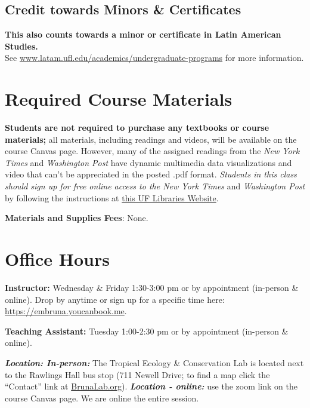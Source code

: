 \documentclass[
  10pt,
  letterpaper,
  oneside,
  open=any]{scrbook}
\begin{document}
\section*{Credit towards Minors \&
Certificates}\label{credit-towards-minors-certificates}


\textbf{This also counts towards a minor or certificate in Latin
American Studies.}\\
See
\href{https://www.latam.ufl.edu/academics/undergraduate-programs/}{www.latam.ufl.edu/academics/undergraduate-programs}
for more information.


\chapter{Required Course Materials}\label{required-course-materials}

\textbf{Students are not required to purchase any textbooks or course
materials;} all materials, including readings and videos, will be
available on the course Canvas page. However, many of the assigned
readings from the \emph{New York Times} and \emph{Washington Post} have
dynamic multimedia data visualizations and video that can't be
appreciated in the posted .pdf format. \emph{Students in this class
should sign up for free online access to the New York Times} and
\emph{Washington Post} by following the instructions at
\href{https://businesslibrary.uflib.ufl.edu/c.php?g=943928&p=7708734}{this
UF Libraries Website}.

\textbf{Materials and Supplies Fees}: None.


\chapter{Office Hours}\label{office-hours}

\textbf{Instructor:} Wednesday \& Friday 1:30-3:00 pm or by appointment
(in-person \& online). Drop by anytime or sign up for a specific time
here: \url{https://embruna.youcanbook.me}.

\textbf{Teaching Assistant:} Tuesday 1:00-2:30 pm or by appointment
(in-person \& online).

\textbf{\emph{Location: In-person:}} The Tropical Ecology \&
Conservation Lab is located next to the Rawlings Hall bus stop (711
Newell Drive; to find a map click the ``Contact'' link at
\href{http://brunalab.org}{BrunaLab.org}). \textbf{\emph{Location -
online:}} use the zoom link on the course Canvas page. We are online the
entire session.
\end{document}
